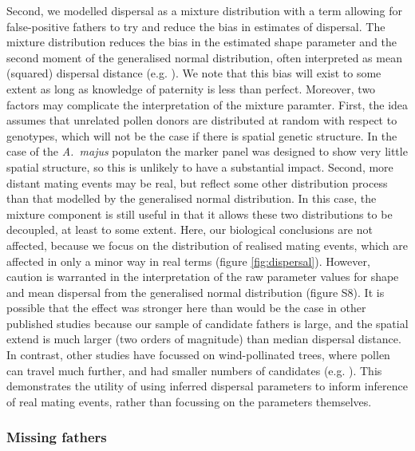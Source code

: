 \documentclass[10pt, a4paper, twocolumn]{article} %
\begin{document}
Second, we modelled dispersal as a mixture distribution with a term allowing for false-positive fathers to try and reduce the bias in estimates of dispersal.
The mixture distribution reduces the bias in the estimated shape parameter and the second moment of the generalised normal distribution, often interpreted as mean (squared) dispersal distance (e.g. \cite{clark1998trees, austerlitz2004using, klein2008pollen}).
We note that this bias will exist to some extent as long as knowledge of paternity is less than perfect.
Moreover, two factors may complicate the interpretation of the mixture paramter.
First, the idea assumes that unrelated pollen donors are distributed at random with respect to genotypes, which will not be the case if there is spatial genetic structure.
In the case of the \textit{A.~majus} populaton the marker panel was designed to show very little spatial structure, so this is unlikely to have a substantial impact.
Second, more distant mating events may be real, but reflect some other distribution process than that modelled by the generalised normal distribution.
In this case, the mixture component is still useful in that it allows these two distributions to be decoupled, at least to some extent.
Here, our biological conclusions are not affected, because we focus on the distribution of realised mating events, which are affected in only a minor way in real terms (figure \ref{fig:dispersal}).
However, caution is warranted in the interpretation of the raw parameter values for shape and mean dispersal from the generalised normal distribution (figure S8).
It is possible that the effect was stronger here than would be the case in other published studies because our sample of candidate fathers is large, and the spatial extend is much larger (two orders of magnitude) than median dispersal distance.
In contrast, other studies have focussed on wind-pollinated trees, where pollen can travel much further, and had smaller numbers of candidates (e.g. \cite{adams1992using, austerlitz2004using, klein2008pollen}).
This demonstrates the utility of using inferred dispersal parameters to inform inference of real mating events, rather than focussing on the parameters themselves.

\subsubsection{Missing fathers}
\end{document}
